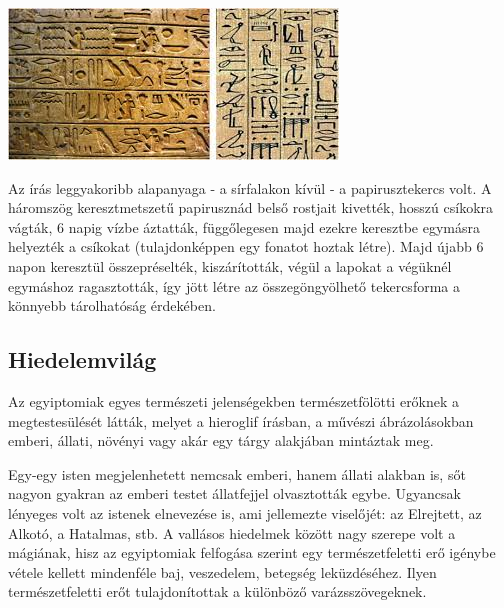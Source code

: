 	\begin{tcolorbox}[enhanced,colframe=gray!50!white,
		colbacktitle=white!15!white,
		coltitle=gray!50!black,
		borderline={0.5mm}{0mm}{gray!15!white},
		borderline={0.5mm}{0mm}{gray!50!white,dashed},
		attach boxed title to top center={yshift=-2mm},
		boxed title style={boxrule=0.4pt},
		title=A hieroglif írás]{
			\includegraphics[width=1.0\linewidth]{images/01/hieroglifa}}
	\end{tcolorbox}

	Az írás leggyakoribb alapanyaga - a sírfalakon kívül - a papirusztekercs volt. A háromszög keresztmetszetű papirusznád belső rostjait kivették, hosszú csíkokra vágták, 6 napig vízbe áztatták, függőlegesen majd ezekre keresztbe egymásra helyezték a csíkokat (tulajdonképpen egy fonatot hoztak létre). Majd újabb 6 napon keresztül összepréselték, kiszárították, végül a lapokat a végüknél egymáshoz ragasztották, így jött létre az összegöngyölhető tekercsforma a könnyebb tárolhatóság érdekében.
	

\subsection*{Hiedelemvilág}

Az egyiptomiak egyes természeti jelenségekben természetfölötti erőknek a megtestesülését látták, melyet a hieroglif írásban, a művészi ábrázolásokban emberi, állati, növényi vagy akár egy tárgy alakjában mintáztak meg. 

Egy-egy isten megjelenhetett nemcsak emberi, hanem állati alakban is, sőt nagyon gyakran az emberi testet állatfejjel olvasztották egybe. Ugyancsak lényeges volt az istenek elnevezése is, ami jellemezte viselőjét: az Elrejtett, az Alkotó, a Hatalmas, stb. A vallásos hiedelmek között nagy szerepe volt a mágiának, hisz az egyiptomiak felfogása szerint egy természetfeletti erő igénybe vétele kellett mindenféle baj, veszedelem, betegség leküzdéséhez. Ilyen természetfeletti erőt tulajdonítottak a különböző varázsszövegeknek.

